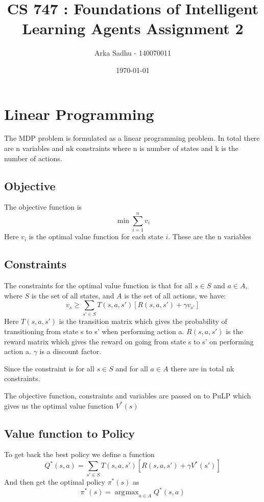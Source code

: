 \documentclass{article}
\title{CS 747 : Foundations of Intelligent Learning Agents Assignment 2}
\author{Arka Sadhu - 140070011}
\date{\today}
\DeclareMathOperator*{\argmax}{\arg\!\max}
\begin{document}
\maketitle

\section{Linear Programming}
The MDP problem is formulated as a linear programming problem. In total there are n variables and nk constraints where n is number of states and k is the number of actions.
\subsection{Objective}
The objective function is
$$\min \sum_{i=1}^n v_i$$
Here $v_i$ is the optimal value function for each state $i$. These are the n variables
\subsection{Constraints}
The constraints for the optimal value function is that for all $s \in S$ and $a \in A$, where $S$ is the set of all states, and $A$ is the set of all actions, we have:
$$v_s \ge \sum_{s'\in S}T(s, a, s')[R(s, a, s') + \gamma v_{s'}]$$
Here $T(s,a,s')$ is the transition matrix which gives the probability of transitioning from state s to s' when performing action a. $R(s,a,s')$ is the reward matrix which gives the reward on going from state s to s' on performing action a. $\gamma$ is a discount factor.

Since the constraint is for all $s \in S$ and for all $a \in A$ there are in total nk constraints.

The objective function, constraints and variables are passed on to PuLP which gives us the optimal value function $V^*(s)$

\subsection{Value function to Policy}
To get back the best policy we define a function
$$Q^*(s, a) = \sum_{s' \in S}T(s, a, s')[R(s,a,s') + \gamma V^*(s')]$$
And then get the optimal policy $\pi^*(s)$ as
$$\pi^* (s) = \argmax_{a \in A} Q^*(s,a)$$
\end{document}
